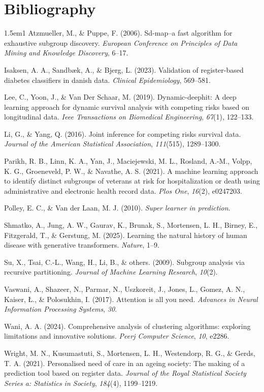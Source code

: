 \documentclass{article}
\begin{document}
\section*{Bibliography}
\label{sec:org47cffd4}
\begin{hangparas}{1.5em}{1}
\hypertarget{citeproc_bib_item_1}{Atzmueller, M., \& Puppe, F. (2006). Sd-map–a fast algorithm for exhaustive subgroup discovery. \textit{European Conference on Principles of Data Mining and Knowledge Discovery}, 6–17.}

\hypertarget{citeproc_bib_item_2}{Isaksen, A. A., Sandbæk, A., \& Bjerg, L. (2023). Validation of register-based diabetes classifiers in danish data. \textit{Clinical Epidemiology}, 569–581.}

\hypertarget{citeproc_bib_item_3}{Lee, C., Yoon, J., \& Van Der Schaar, M. (2019). Dynamic-deephit: A deep learning approach for dynamic survival analysis with competing risks based on longitudinal data. \textit{Ieee Transactions on Biomedical Engineering}, \textit{67}(1), 122–133.}

\hypertarget{citeproc_bib_item_4}{Li, G., \& Yang, Q. (2016). Joint inference for competing risks survival data. \textit{Journal of the American Statistical Association}, \textit{111}(515), 1289–1300.}

\hypertarget{citeproc_bib_item_5}{Parikh, R. B., Linn, K. A., Yan, J., Maciejewski, M. L., Rosland, A.-M., Volpp, K. G., Groeneveld, P. W., \& Navathe, A. S. (2021). A machine learning approach to identify distinct subgroups of veterans at risk for hospitalization or death using administrative and electronic health record data. \textit{Plos One}, \textit{16}(2), e0247203.}

\hypertarget{citeproc_bib_item_6}{Polley, E. C., \& Van der Laan, M. J. (2010). \textit{Super learner in prediction}.}

\hypertarget{citeproc_bib_item_7}{Shmatko, A., Jung, A. W., Gaurav, K., Brunak, S., Mortensen, L. H., Birney, E., Fitzgerald, T., \& Gerstung, M. (2025). Learning the natural history of human disease with generative transformers. \textit{Nature}, 1–9.}

\hypertarget{citeproc_bib_item_8}{Su, X., Tsai, C.-L., Wang, H., Li, B., \& others. (2009). Subgroup analysis via recursive partitioning. \textit{Journal of Machine Learning Research}, \textit{10}(2).}

\hypertarget{citeproc_bib_item_9}{Vaswani, A., Shazeer, N., Parmar, N., Uszkoreit, J., Jones, L., Gomez, A. N., Kaiser, Ł., \& Polosukhin, I. (2017). Attention is all you need. \textit{Advances in Neural Information Processing Systems}, \textit{30}.}

\hypertarget{citeproc_bib_item_10}{Wani, A. A. (2024). Comprehensive analysis of clustering algorithms: exploring limitations and innovative solutions. \textit{Peerj Computer Science}, \textit{10}, e2286.}

\hypertarget{citeproc_bib_item_11}{Wright, M. N., Kusumastuti, S., Mortensen, L. H., Westendorp, R. G., \& Gerds, T. A. (2021). Personalised need of care in an ageing society: The making of a prediction tool based on register data. \textit{Journal of the Royal Statistical Society Series a: Statistics in Society}, \textit{184}(4), 1199–1219.}\bigskip
\end{hangparas}
\end{document}
